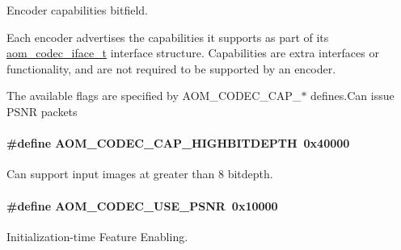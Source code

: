 Encoder capabilities bitfield. 

Each encoder advertises the capabilities it supports as part of its \hyperlink{group__codec_ga4ef55b44c762836d1550e11921bed403}{aom\+\_\+codec\+\_\+iface\+\_\+t} interface structure. Capabilities are extra interfaces or functionality, and are not required to be supported by an encoder.

The available flags are specified by A\+O\+M\+\_\+\+C\+O\+D\+E\+C\+\_\+\+C\+A\+P\+\_\+$\ast$ defines.\+Can issue P\+S\+NR packets 
\paragraph[{\texorpdfstring{A\+O\+M\+\_\+\+C\+O\+D\+E\+C\+\_\+\+C\+A\+P\+\_\+\+H\+I\+G\+H\+B\+I\+T\+D\+E\+P\+TH}{AOM_CODEC_CAP_HIGHBITDEPTH}}]{\setlength{\rightskip}{0pt plus 5cm}\#define A\+O\+M\+\_\+\+C\+O\+D\+E\+C\+\_\+\+C\+A\+P\+\_\+\+H\+I\+G\+H\+B\+I\+T\+D\+E\+P\+TH~0x40000}\hypertarget{group__encoder_ga608725216f15096fa209d30fef121c1c}{}\label{group__encoder_ga608725216f15096fa209d30fef121c1c}
Can support input images at greater than 8 bitdepth. 
\paragraph[{\texorpdfstring{A\+O\+M\+\_\+\+C\+O\+D\+E\+C\+\_\+\+U\+S\+E\+\_\+\+P\+S\+NR}{AOM_CODEC_USE_PSNR}}]{\setlength{\rightskip}{0pt plus 5cm}\#define A\+O\+M\+\_\+\+C\+O\+D\+E\+C\+\_\+\+U\+S\+E\+\_\+\+P\+S\+NR~0x10000}\hypertarget{group__encoder_gae722c9f9ba9b4ca8dba6bbe7c0692024}{}\label{group__encoder_gae722c9f9ba9b4ca8dba6bbe7c0692024}


Initialization-\/time Feature Enabling. 

